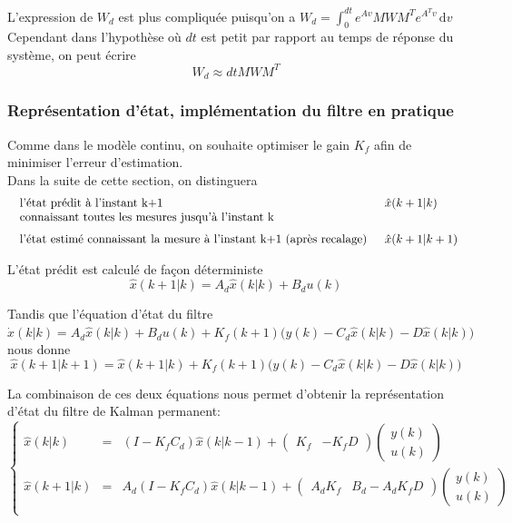 \documentclass[12pt,twoside,a4paper]{article}
\begin{document}
\noindent L'expression de $W_d$ est plus compliquée puisqu'on a $W_d = \int_0^{dt}e^{Av}MWM^Te^{A^T v} \, \mathrm{d}v$ \\
Cependant dans l'hypothèse où $dt$ est petit par rapport au temps de réponse du système, on peut écrire
$$ W_d \approx dtMWM^T$$ 

\subsubsection{Représentation d'état, implémentation du filtre en pratique}


Comme dans le modèle continu, on souhaite optimiser le gain $K_{f}$ afin de minimiser l'erreur d'estimation. \\
Dans la suite de cette section, on distinguera 
$$
\begin{array}{ll}
	\begin{array}[t]{l}
	\text{l'état prédit à l'instant k+1}\\
	\text{connaissant toutes les mesures jusqu'à l'instant k} 
	\end{array} & \hat x(k+1|k) \\
	
	\begin{array}{l}
	\text{l'état estimé connaissant la mesure à l'instant k+1 (après recalage)} 
	\end{array} & \hat x(k+1|k+1) \rule{0pt}{15pt}
\end{array}
$$ 

\noindent L'état prédit est calculé de fa\c con déterministe
$$ \hat x(k+1|k) = A_{d} \hat x (k|k) +B_du(k)$$

\noindent Tandis que l'équation d'état du filtre 
$$ \hat{\dot{x}}(k|k) = A_d\hat{x}(k|k)+B_du(k)+K_f(k+1)\big(y(k) - C_{d} \hat x(k|k) - D \hat x(k|k) \big) $$
\indent nous donne 
$$ \hat x(k+1|k+1) = \hat x(k+1|k)+ K_{f}(k+1)\big(y(k) - C_{d} \hat x(k|k) - D \hat x(k|k) \big)$$

La combinaison de ces deux équations nous permet d'obtenir la représentation d'état du filtre de Kalman permanent: 
$$
\boxed{
\left\{
\begin{array}{lll}
\hat x(k|k) &=& (I-K_f C_d)\hat x(k|k-1)+
	\begin{pmatrix} K_f & -K_f D \end{pmatrix}
	\begin{pmatrix} y(k) \\ u(k) \end{pmatrix} \\
\hat x( k+1|k) &=& A_d(I-K_f C_d) \hat x (k|k-1) + 
	\begin{pmatrix} A_d K_f & B_d-A_dK_fD \end{pmatrix}
	\begin{pmatrix} y(k) \\ u(k)\end{pmatrix} \\
\end{array}
\right.}
$$
\end{document}

